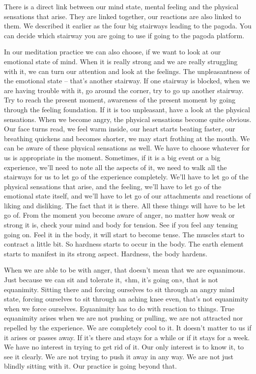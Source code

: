 \documentclass[letterpaper,10pt,english]{sphinxmanual}
\begin{document}
\sphinxAtStartPar
There is a direct link between our mind state, mental feeling and the
physical  sensations  that  arise.  They  are  linked  together,  our  reactions  are
also linked to them. We described it earlier as the four big stairways leading
to the pagoda. You can decide which stairway you are going to use if going
to the pagoda platform.

\sphinxAtStartPar
In our meditation practice we can also choose, if we want to look at
our emotional state of mind. When it is really strong and we are really struggling with it, we can turn our attention and look at the feelings. The unpleasantness of the emotional state – that’s another stairway. If one stairway is
blocked, when we are having trouble with it, go around the corner, try to go
up another stairway. Try to reach the present moment, awareness of the present moment by going through the feeling foundation. If it is too unpleasant,
have a look at the physical sensations. When we become angry, the physical
sensations become quite obvious. Our face turns read, we feel warm inside,
our heart starts beating faster, our breathing quickens and becomes shorter,
we may start frothing at the mouth. We can be aware of these physical sensations  as  well.  We  have  to  choose  whatever  for  us  is  appropriate  in  the
moment. Sometimes, if it is a big event or a big experience, we’ll need to
note all the aspects of it, we need to walk all the stairways for us to let go
of the experience completely. We’ll have to let go of the physical sensations
that arise, and the feeling, we’ll have to let go of the emotional state itself,
and we’ll have to let go of our attachments and reactions of liking and disliking. The fact that it is there. All these things will have to be let go of. From
the moment you become aware of anger, no matter how weak or strong it is,
check your mind and body for tension. See if you feel any tensing going on.
Feel it in the body, it will start to become tense. The muscles start to contract
a little bit. So hardness starts to occur in the body. The earth element starts to
manifest in its strong aspect. Hardness, the body hardens.

\sphinxAtStartPar
When we are able to be with anger, that doesn’t mean that we are equanimous.   Just because we can sit and tolerate it, «hm, it’s going on», that is
not equanimity. Sitting there and forcing ourselves to sit through an angry
mind state, forcing ourselves to sit through an aching knee even, that’s not
equanimity when we force ourselves. Equanimity has to do with reaction to
things. True equanimity arises when we are not pushing or pulling, we are
not attracted nor repelled by the experience. We are completely cool to it.
It doesn’t matter to us if it arises or passes away. If it’s there and stays for a
while or if it stays for a week. We have no interest in trying to get rid of it.
Our only interest is to know it, to see it clearly. We are not trying to push it
away in any way. We are not just blindly sitting with it. Our practice is going
beyond that.
\end{document}
